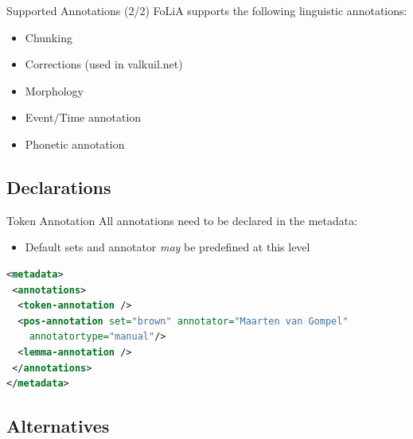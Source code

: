 \documentclass[compress,10pt]{beamer}
\begin{document}
\begin{frame}
    \begin{block}{Supported Annotations (2/2)}
        FoLiA supports the following linguistic annotations:
        \begin{itemize}                       
            \item Chunking
            \item Corrections (used in valkuil.net)
            \item Morphology
            \item Event/Time annotation
            \item Phonetic annotation
        \end{itemize}   
    \end{block}
\end{frame}

        
\subsection{Declarations}

\begin{frame}[fragile]
    \begin{block}{Token Annotation}
        All annotations need to be declared in the metadata:
        \begin{itemize}
            \item Default sets and annotator \emph{may} be predefined at this level
        \end{itemize}
    \end{block}
    \begin{example}
\begin{lstlisting}[language=xml]
<metadata>
 <annotations>
  <token-annotation />
  <pos-annotation set="brown" annotator="Maarten van Gompel"
    annotatortype="manual"/>
  <lemma-annotation />
 </annotations>
</metadata>                     
\end{lstlisting}        
    \end{example}
\end{frame}

\subsection{Alternatives}
\end{document}
